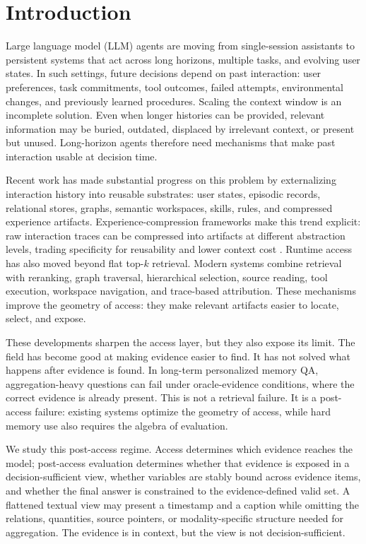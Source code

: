 \section{Introduction}
\label{sec:introduction}

Large language model (LLM) agents are moving from single-session assistants to persistent systems that act across long horizons, multiple tasks, and evolving user states.
In such settings, future decisions depend on past interaction: user preferences, task commitments, tool outcomes, failed attempts, environmental changes, and previously learned procedures.
Scaling the context window is an incomplete solution.
Even when longer histories can be provided, relevant information may be buried, outdated, displaced by irrelevant context, or present but unused.
Long-horizon agents therefore need mechanisms that make past interaction usable at decision time.

Recent work has made substantial progress on this problem by externalizing interaction history into reusable substrates: user states, episodic records, relational stores, graphs, semantic workspaces, skills, rules, and compressed experience artifacts.
Experience-compression frameworks make this trend explicit: raw interaction traces can be compressed into artifacts at different abstraction levels, trading specificity for reusability and lower context cost \cite{zhang2026experiencecompressionspectrumunifying}.
Runtime access has also moved beyond flat top-$k$ retrieval.
Modern systems combine retrieval with reranking, graph traversal, hierarchical selection, source reading, tool execution, workspace navigation, and trace-based attribution.
These mechanisms improve the geometry of access: they make relevant artifacts easier to locate, select, and expose.

These developments sharpen the access layer, but they also expose its limit.
The field has become good at making evidence easier to find.
It has not solved what happens after evidence is found.
In long-term personalized memory QA, aggregation-heavy questions can fail under oracle-evidence conditions, where the correct evidence is already present.
This is not a retrieval failure.
It is a post-access failure: existing systems optimize the geometry of access, while hard memory use also requires the algebra of evaluation.

We study this post-access regime.
Access determines which evidence reaches the model; post-access evaluation determines whether that evidence is exposed in a decision-sufficient view, whether variables are stably bound across evidence items, and whether the final answer is constrained to the evidence-defined valid set.
A flattened textual view may present a timestamp and a caption while omitting the relations, quantities, source pointers, or modality-specific structure needed for aggregation.
The evidence is in context, but the view is not decision-sufficient.

